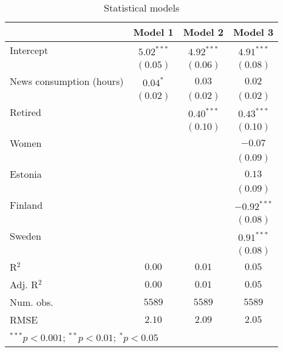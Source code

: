 
\begin{table}
\begin{center}
\begin{tabular}{l c c c}
\hline
 & Model 1 & Model 2 & Model 3 \\
\hline
Intercept                & $5.02^{***}$ & $4.92^{***}$ & $4.91^{***}$  \\
                         & $(0.05)$     & $(0.06)$     & $(0.08)$      \\
News consumption (hours) & $0.04^{*}$   & $0.03$       & $0.02$        \\
                         & $(0.02)$     & $(0.02)$     & $(0.02)$      \\
Retired                  &              & $0.40^{***}$ & $0.43^{***}$  \\
                         &              & $(0.10)$     & $(0.10)$      \\
Women                    &              &              & $-0.07$       \\
                         &              &              & $(0.09)$      \\
Estonia                  &              &              & $0.13$        \\
                         &              &              & $(0.09)$      \\
Finland                  &              &              & $-0.92^{***}$ \\
                         &              &              & $(0.08)$      \\
Sweden                   &              &              & $0.91^{***}$  \\
                         &              &              & $(0.08)$      \\
\hline
R$^2$                    & $0.00$       & $0.01$       & $0.05$        \\
Adj. R$^2$               & $0.00$       & $0.01$       & $0.05$        \\
Num. obs.                & $5589$       & $5589$       & $5589$        \\
RMSE                     & $2.10$       & $2.09$       & $2.05$        \\
\hline
\multicolumn{4}{l}{\scriptsize{$^{***}p<0.001$; $^{**}p<0.01$; $^{*}p<0.05$}}
\end{tabular}
\caption{Statistical models}
\label{table:coefficients}
\end{center}
\end{table}
